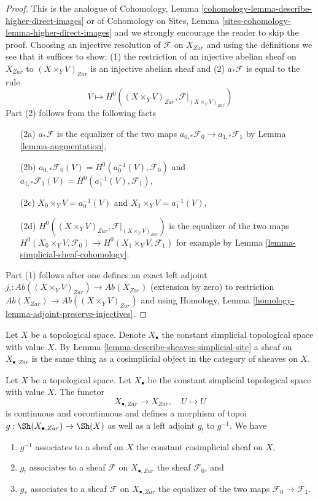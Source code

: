 \begin{proof}
This is the analogue of
Cohomology, Lemma \ref{cohomology-lemma-describe-higher-direct-images} or of
Cohomology on Sites, Lemma \ref{sites-cohomology-lemma-higher-direct-images}
and we strongly encourage the reader to skip the proof.
Choosing an injective resolution of $\mathcal{F}$ on
$X_{Zar}$ and using the definitions we see that it suffices to show:
(1) the restriction of an injective abelian
sheaf on $X_{Zar}$ to $(X \times_Y V)_{Zar}$ is an injective abelian sheaf and
(2) $a_*\mathcal{F}$ is equal to the rule
$$
V \longmapsto H^0((X \times_Y V)_{Zar}, \mathcal{F}|_{(X \times_Y V)_{Zar}})
$$
Part (2) follows from the following facts
\begin{enumerate}
\item[(2a)] $a_*\mathcal{F}$ is the equalizer of the two maps
$a_{0, *}\mathcal{F}_0 \to a_{1, *}\mathcal{F}_1$
by Lemma \ref{lemma-augmentation},
\item[(2b)] $a_{0, *}\mathcal{F}_0(V) =
H^0(a_0^{-1}(V), \mathcal{F}_0)$ and
$a_{1, *}\mathcal{F}_1(V) = H^0(a_1^{-1}(V), \mathcal{F}_1)$,
\item[(2c)] $X_0 \times_Y V = a_0^{-1}(V)$ and $X_1 \times_Y V = a_1^{-1}(V)$,
\item[(2d)] $H^0((X \times_Y V)_{Zar}, \mathcal{F}|_{(X \times_Y V)_{Zar}})$
is the equalizer of the two maps
$H^0(X_0 \times_Y V, \mathcal{F}_0) \to H^0(X_1 \times_Y V, \mathcal{F}_1)$
for example by Lemma \ref{lemma-simplicial-sheaf-cohomology}.
\end{enumerate}
Part (1) follows after one defines an exact left adjoint
$j_! : \textit{Ab}((X \times_Y V)_{Zar}) \to \textit{Ab}(X_{Zar})$
(extension by zero) to restriction
$\textit{Ab}(X_{Zar}) \to \textit{Ab}((X \times_Y V)_{Zar})$
and using Homology, Lemma \ref{homology-lemma-adjoint-preserve-injectives}.
\end{proof}

\noindent
Let $X$ be a topological space. Denote $X_\bullet$ the constant simplicial
topological space with value $X$. By
Lemma \ref{lemma-describe-sheaves-simplicial-site}
a sheaf on $X_{\bullet, Zar}$ is the same
thing as a cosimplicial object in the category of sheaves on $X$.

\begin{lemma}
\label{lemma-constant-simplicial-space}
Let $X$ be a topological space. Let $X_\bullet$ be the constant
simplicial topological space with value $X$. The functor
$$
X_{\bullet, Zar} \longrightarrow X_{Zar},\quad
U \longmapsto U
$$
is continuous and cocontinuous and defines a morphism of
topoi $g : \Sh(X_{\bullet, Zar}) \to \Sh(X)$ as well as a left adjoint
$g_!$ to $g^{-1}$. We have
\begin{enumerate}
\item $g^{-1}$ associates to a sheaf on $X$ the constant cosimplicial
sheaf on $X$,
\item $g_!$ associates to a sheaf $\mathcal{F}$ on $X_{\bullet, Zar}$ the
sheaf $\mathcal{F}_0$, and
\item $g_*$ associates to a sheaf $\mathcal{F}$ on $X_{\bullet, Zar}$ the
equalizer of the two maps $\mathcal{F}_0 \to \mathcal{F}_1$.
\end{enumerate}
\end{lemma}

